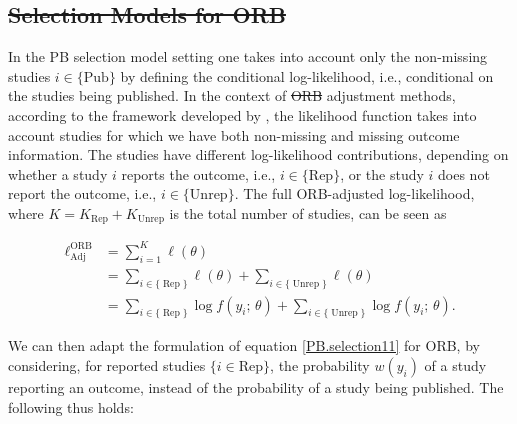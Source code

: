 \documentclass[twocolumn]{article}\usepackage[]{graphicx}\usepackage[]{xcolor}
\providecommand{\DIFaddtex}[1]{{\protect\color{blue}\uwave{#1}}} %
\providecommand{\DIFdeltex}[1]{{\protect\color{red}\sout{#1}}}                      %
\providecommand{\DIFaddbegin}{} %
\providecommand{\DIFaddend}{} %
\providecommand{\DIFdelbegin}{} %
\providecommand{\DIFdelend}{} %
\providecommand{\DIFadd}[1]{\texorpdfstring{\DIFaddtex{#1}}{#1}} %
\providecommand{\DIFdel}[1]{\texorpdfstring{\DIFdeltex{#1}}{}} %
\newcommand{\DIFscaledelfig}{0.5}
\newlength{\DIFdelgraphicswidth} %
\newlength{\DIFdelgraphicsheight} %
\newcommand{\DIFaddincludegraphics}[2][]{{\color{blue}\fbox{\DIFOincludegraphics[#1]{#2}}}} %
\newcommand{\DIFdelincludegraphics}[2][]{%
\sbox{\DIFdelgraphicsbox}{\DIFOincludegraphics[#1]{#2}}%
\settoboxwidth{\DIFdelgraphicswidth}{\DIFdelgraphicsbox} %
\settoboxtotalheight{\DIFdelgraphicsheight}{\DIFdelgraphicsbox} %
\scalebox{\DIFscaledelfig}{%
\parbox[b]{\DIFdelgraphicswidth}{\usebox{\DIFdelgraphicsbox}\\[-\baselineskip] \rule{\DIFdelgraphicswidth}{0em}}\llap{\resizebox{\DIFdelgraphicswidth}{\DIFdelgraphicsheight}{%
\setlength{\unitlength}{\DIFdelgraphicswidth}%
\begin{picture}(1,1)%
\thicklines\linethickness{2pt} %
{\color[rgb]{1,0,0}\put(0,0){\framebox(1,1){}}}%
{\color[rgb]{1,0,0}\put(0,0){\line( 1,1){1}}}%
{\color[rgb]{1,0,0}\put(0,1){\line(1,-1){1}}}%
\end{picture}%
}\hspace*{3pt}}} %
} %
\DeclareRobustCommand{\DIFaddbegin}{\DIFOaddbegin \let\includegraphics\DIFaddincludegraphics} %
\DeclareRobustCommand{\DIFaddend}{\DIFOaddend \let\includegraphics\DIFOincludegraphics} %
\DeclareRobustCommand{\DIFdelbegin}{\DIFOdelbegin \let\includegraphics\DIFdelincludegraphics} %
\DeclareRobustCommand{\DIFdelend}{\DIFOaddend \let\includegraphics\DIFOincludegraphics} %
\begin{document}
\DIFdelbegin \subsection{\DIFdel{Selection Models for ORB}} %
\addtocounter{subsection}{-1}%
\DIFdelend %

In the PB selection model setting one takes into account only the non-missing studies $i \in \{\text{Pub} \}$ by defining the conditional log-likelihood, i.e., conditional on the studies being published. In the context of \DIFdelbegin \DIFdel{ORB }\DIFdelend \DIFaddbegin \DIFadd{outcome reportin bias (ORB) }\DIFaddend adjustment methods, according to the framework developed by \citet{Copas2019}, the likelihood function takes into account studies for which we have both non-missing and missing outcome information. The studies have different log-likelihood contributions, depending on whether a study $i$ reports the outcome, i.e., $i \in \{\text{Rep} \}$, or the study $i$ does not report the outcome, i.e., $i \in \{ \text{Unrep} \}$. The full ORB-adjusted log-likelihood, where $K = K_{\text {Rep}}+ K_{\text {Unrep}}$ is the total number of studies, can be seen as


\begin{equation}
\label{lik.full}
\begin{aligned}
\ell_{\text{Adj}}^{\text{ORB}} & =\sum_{i=1}^K \ell \left(\theta \right)\\
& =\sum_{i \in \{ \operatorname{Rep}\} } \ell\left(\theta \right)+\sum_{i \in \{\operatorname{Unrep} \} } \ell\left(\theta \right) \\
& =\sum_{i \in \{\operatorname{Rep} \} } \log f \left(y_i \text{; } \theta \right)+\sum_{i \in \{\operatorname{Unrep} \} } \log f \left(y_i \text{; } \theta \right) \text{.}
\end{aligned}
\end{equation}

\bigskip

We can then adapt the formulation of equation \eqref{PB.selection11} for ORB, by considering, for reported studies $ \{i \in \text{Rep} \}$, the probability $w(y_i)$ of a study reporting an outcome, instead of the probability of a study being published. The following thus holds:
\end{document}
